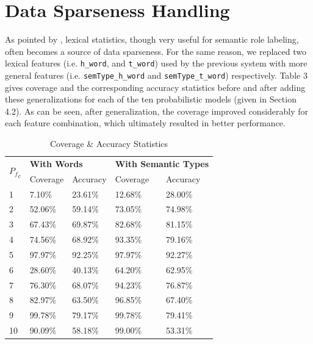 \documentclass[11pt]{article}
\begin{document}
\section{Data Sparseness Handling}
As pointed by \cite{Gildea:2002}, lexical statistics, though very useful for semantic role labeling, often becomes a source of data sparseness. For the same reason, we replaced two lexical features (i.e. \verb+h_word+, and \verb+t_word+) used by the previous system with more general features (i.e. \verb+semType_h_word+ and \verb+semType_t_word+) respectively. Table 3 gives coverage and the corresponding accuracy statistics before and after adding these generalizations for each of the ten probabilistic models (given in Section 4.2). As can be seen, after generalization, the coverage improved considerably for each feature combination, which ultimately resulted in better performance.
\begin{table}[!h]
\small
\begin{center}
\begin{tabular}{|l|l|l|l|l|}
\hline
\multirow{2}{*}{\bf${P_f}_c$} & \multicolumn{2}{|l}{{\bf With Words}} & \multicolumn{2}{|l|}{\bf With Semantic Types} \\ \cline{2-5} 
                  &   Coverage       &      Accuracy     &     Coverage       &     Accuracy      \\ \hline
   1              &    7.10\%       &    23.61\%       &   12.68\%         &        28.00\%   \\ 
   2              &    52.06\%      &     59.14\%      &   73.05\%         &        74.98\% \\ 
   3              &    67.43\%      &     69.87\%      &   82.68\%         &        81.15\%   \\ 
   4              &    74.56\%       &     68.92\%     &   93.35\%          &        79.16\%  \\ 
   5              &    97.97\%      &      92.25\%     &   97.97\%         &         92.27\%  \\ 
   6              &    28.60\%       &     40.13\%      &  64.20\%          &        62.95\%   \\ 
   7              &    76.30\%       &     68.07\%      &  94.23\%          &        76.87\%  \\ 
   8              &    82.97\%       &      63.50\%     &  96.85\%          &        67.40\%  \\ 
   9              &    99.78\%       &      79.17\%     &   99.78\%         &        79.41\%   \\ 
   10             &    90.09\%       &      58.18\%     &   99.00\%         &          53.31\% \\ \hline
\end{tabular}  
\caption{Coverage \& Accuracy Statistics}
\end{center}
\label{tab:coverage-stats}
\end{table}
\normalsize
\end{document}
